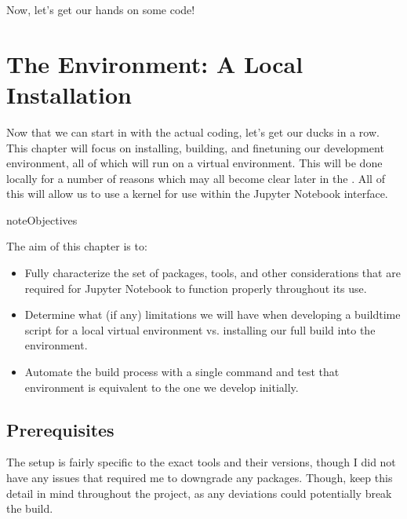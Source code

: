 \documentclass[letterpaper,12pt,english]{sphinxmanual}
\begin{document}
\sphinxAtStartPar
Now, let’s get our hands on some code!

\sphinxstepscope


\chapter{The Environment: A Local  Installation}
\label{\detokenize{_notebooks/01-the-env:the-environment-a-local-conda-installation}}\label{\detokenize{_notebooks/01-the-env::doc}}
\sphinxAtStartPar
Now that we can start in with the actual coding, let’s get our ducks in a row. This chapter will focus on installing, building, and fine\sphinxhyphen{}tuning our development environment, all of which will run on a  virtual environment. This will be done locally for a number of reasons which may all become clear later in the {\hyperref[\detokenize{_notebooks/01-the-env:why-a-virtual-environment}]{}}. All of this will allow us to use a  kernel for use within the Jupyter Notebook interface.

\begin{sphinxadmonition}{note}{Objectives}

\sphinxAtStartPar
The aim of this chapter is to:
\begin{itemize}
\item {} 
\sphinxAtStartPar
Fully characterize the set of packages, tools, and other considerations that are required for Jupyter Notebook to function properly throughout its use.

\item {} 
\sphinxAtStartPar
Determine what (if any) limitations we will have when developing a build\sphinxhyphen{}time script for a local  virtual environment vs. installing our full build into the  environment.

\item {} 
\sphinxAtStartPar
Automate the build process with a single command and test that environment is equivalent to the one we develop initially.

\end{itemize}
\end{sphinxadmonition}


\section{Prerequisites}
\label{\detokenize{_notebooks/01-the-env:prerequisites}}
\sphinxAtStartPar
The setup is fairly specific to the exact tools and their versions, though I did not have any issues that required me to downgrade any packages. Though, keep this detail in mind throughout the project, as any deviations could potentially break the build.
\end{document}
